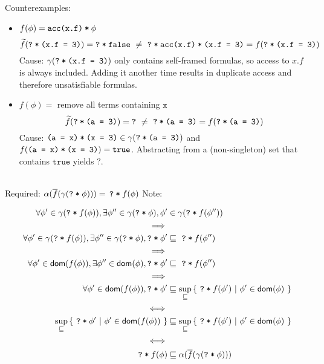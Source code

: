 \documentclass[11pt,a4paper]{article}
\newcommand{\grad}[1]{\widetilde{#1}}
\newcommand{\ttt}{\texttt}
\newcommand{\predicate}{\textsf}
\newcommand{\edot}[2]{\ttt{#1.#2}}
\newcommand{\phiCons}[2]{\ttt{#1\:*\:#2}}
\newcommand{\phiFalse}[0]{\ttt{false}}
\newcommand{\phiTrue}[0]{\ttt{true}}
\newcommand{\phiEq}[2]{\ttt{(#1 = #2)}}
\newcommand{\phiAcc}[2]{\ttt{acc(#1.#2)}}
\newcommand{\qm}{\ttt{?}}
\newcommand{\withqm}[1]{\ttt{\qm\:*\:$#1$}}
\newcommand{\dom}{\predicate{dom}}
\begin{document}
Counterexamples:
\begin{itemize}
\item $f(\phi) = \phiCons{\phiAcc {x} {f}}{$\phi$}$ \\
    \begin{equation*}
    \grad{f}(\withqm{\phiEq{\edot{x}{f}}{3}}) = \withqm{\phiFalse} 
    ~\neq~
    \withqm{\phiCons{\phiAcc {x} {f}} {\phiEq{\edot{x}{f}}{3}}} = f(\withqm{\phiEq{\edot{x}{f}}{3}})
    \end{equation*}
    Cause: $\gamma(\withqm{\phiEq{\edot{x}{f}}{3}})$ only contains self-framed formulas, so access to $x.f$ is always included. Adding it another time results in duplicate access and therefore unsatisfiable formulas.
\item $f(\phi) = $ remove all terms containing $\ttt{x}$ \\
    \begin{equation*}
    \grad{f}(\withqm{\phiEq{a}{3}}) = \qm 
    ~\neq~
    \withqm{\phiEq{a}{3}} = f(\withqm{\phiEq{a}{3}})
    \end{equation*}
    Cause: $\phiCons{\phiEq{a}{x}}{\phiEq{x}{3}} \in \gamma(\withqm{\phiEq{a}{3}})$ and $f(\phiCons{\phiEq{a}{x}}{\phiEq{x}{3}}) = \phiTrue$.
    Abstracting from a (non-singleton) set that contains $\phiTrue$ yields $\qm$.
\end{itemize}

~\\
Required: $\alpha(\overline{f}(\gamma(\withqm{\phi}))) =\, \withqm{f(\phi)}$
Note: 

\begin{align*}
\forall \phi' \in \gamma(\withqm{f(\phi)}), \exists \phi'' \in \gamma(\withqm{\phi}), \phi' &\in \gamma(\withqm{f(\phi'')}) \\
\implies \\
\forall \phi' \in \gamma(\withqm{f(\phi)}), \exists \phi'' \in \gamma(\withqm{\phi}), \withqm{\phi'} &\sqsubseteq \,\,\withqm{f(\phi'')} \\
\implies \\
\forall \phi' \in \dom(f(\phi)), \exists \phi'' \in \dom(\phi), \withqm{\phi'} &\sqsubseteq \,\,\withqm{f(\phi'')} \\
\implies \\
\forall \phi' \in \dom(f(\phi)), \withqm{\phi'} &\sqsubseteq \sup_{\sqsubseteq} {\{~ \withqm{f(\phi')} ~|~ \phi' \in \dom(\phi) ~\}} \\
\iff \\
\sup_{\sqsubseteq} {\{~ \withqm{\phi'} ~|~ \phi' \in \dom(f(\phi)) ~\}} &\sqsubseteq \sup_{\sqsubseteq} {\{~ \withqm{f(\phi')} ~|~ \phi' \in \dom(\phi) ~\}} \\
\iff \\
\withqm{f(\phi)}  &\sqsubseteq \alpha(\overline{f}(\gamma(\withqm{\phi})))
\end{align*}
\end{document}
